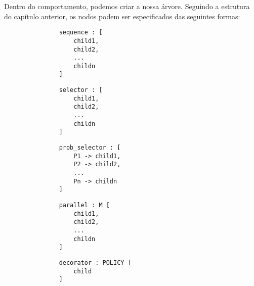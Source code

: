 Dentro do comportamento, podemos criar a nossa árvore.
Seguindo a estrutura do capítulo anterior, os nodos podem ser especificados das seguintes formas:
\begin{figure}[H]
\centering
\begin{subfigure}{0.45\linewidth}
\begin{lstlisting}
    sequence : [
        child1,
        child2,
        ...
        childn
    ]
\end{lstlisting}
\end{subfigure}
\hfil
\begin{subfigure}{0.45\linewidth}
\begin{lstlisting}
    selector : [
        child1,
        child2,
        ...
        childn
    ]
\end{lstlisting}
\end{subfigure}
\end{figure}
\begin{figure}[H]
\begin{subfigure}{0.45\linewidth}
\begin{lstlisting}
    prob_selector : [
        P1 -> child1,
        P2 -> child2,
        ...
        Pn -> childn
    ]
\end{lstlisting}
\end{subfigure}
\hfil
\begin{subfigure}{0.45\linewidth}
\begin{lstlisting}
    parallel : M [
        child1,
        child2,
        ...
        childn
    ]
\end{lstlisting}
\end{subfigure}
\begin{subfigure}{0.45\linewidth}
\begin{lstlisting}
    decorator : POLICY [
        child
    ]
\end{lstlisting}
\end{subfigure}
\end{figure}

